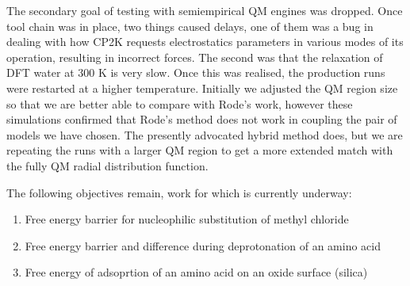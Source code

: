 \documentclass[11pt]{revtex4}
\begin{document}
The secondary goal of testing with semiempirical QM engines was dropped. Once tool chain was in place, two things caused delays, one of them was a bug in dealing with how CP2K requests electrostatics parameters in various modes of its operation, resulting in incorrect forces. The second was that the relaxation of DFT water at 300 K is very slow. Once this was realised, the production runs were restarted at a higher temperature. Initially we adjusted the QM region size so that we are  better able to compare with Rode's work, however these simulations confirmed that Rode's method does not work in coupling the pair of models we have chosen. The presently advocated hybrid method does, but we are repeating the runs with a larger QM region to get a more extended match with the fully QM radial distribution function.

The following objectives remain, work for which is currently underway:
\begin{enumerate}
\item{Free energy barrier for nucleophilic substitution of methyl chloride}
\item{Free energy barrier and difference during deprotonation of an amino acid}
\item{Free energy of adsoprtion of an amino acid on an oxide surface (silica)}
\end{enumerate}


\end{document}
